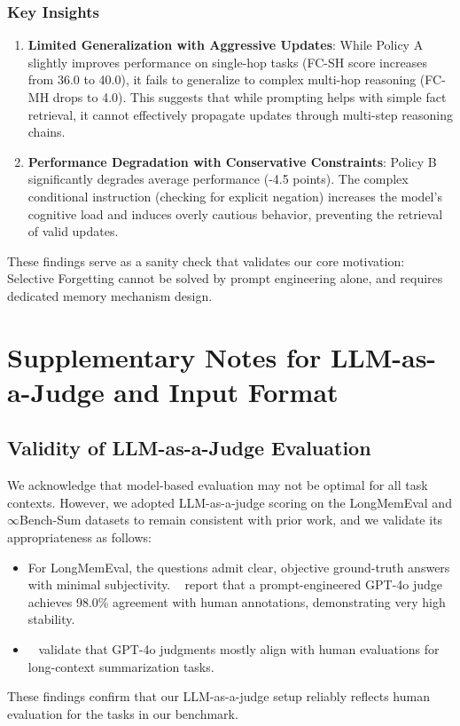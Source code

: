 \subsubsection{Key Insights}
\begin{enumerate}
    \item \textbf{Limited Generalization with Aggressive Updates}: While Policy A slightly improves performance on single-hop tasks (FC-SH score increases from 36.0 to 40.0), it fails to generalize to complex multi-hop reasoning (FC-MH drops to 4.0). This suggests that while prompting helps with simple fact retrieval, it cannot effectively propagate updates through multi-step reasoning chains.
    \item \textbf{Performance Degradation with Conservative Constraints}: Policy B significantly degrades average performance (-4.5 points). The complex conditional instruction (checking for explicit negation) increases the model's cognitive load and induces overly cautious behavior, preventing the retrieval of valid updates.
\end{enumerate}
These findings serve as a sanity check that validates our core motivation: Selective Forgetting cannot be solved by prompt engineering alone, and requires dedicated memory mechanism design.

\section{Supplementary Notes for LLM-as-a-Judge and Input Format}
\label{app:additional_notes}

\subsection{Validity of LLM-as-a-Judge Evaluation}
We acknowledge that model-based evaluation may not be optimal for all task contexts. However, we adopted LLM-as-a-judge scoring on the LongMemEval and $\infty$Bench-Sum datasets to remain consistent with prior work, and we validate its appropriateness as follows:
\begin{itemize}
    \item For LongMemEval, the questions admit clear, objective ground-truth answers with minimal subjectivity. ~\citet{longmemeval} report that a prompt-engineered GPT-4o judge achieves 98.0\% agreement with human annotations, demonstrating very high stability.
    \item ~\citet{HELMET} validate that GPT-4o judgments mostly align with human evaluations for long-context summarization tasks.
\end{itemize}
These findings confirm that our LLM-as-a-judge setup reliably reflects human evaluation for the tasks in our benchmark.

